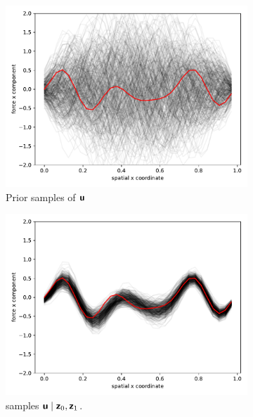 \documentclass{article}
\theoremstyle{plain}
\theoremstyle{definition}
\theoremstyle{remark}
\begin{document}
\begin{figure}[h!t]
    \begin{subfigure}{0.3\textwidth}
        \includegraphics[scale=0.35]{meth_ex_guess_0.pdf}
         \caption{Prior samples of \(\boldsymbol{\mathsf{u}}\)}
         \label{fig:meth_ex_0}
    \end{subfigure}
    \begin{subfigure}{0.3\textwidth}
        \includegraphics[scale=0.35]{meth_ex_guess_1.pdf}
         \caption{\meth{} samples \(\boldsymbol{\mathsf{u}}\mid \boldsymbol{\mathsf{z}}_0,\boldsymbol{\mathsf{z}}_1\).}
         \label{fig:meth_ex_1}
    \end{subfigure}
    \begin{subfigure}{0.3\textwidth}

\end{subfigure}
\end{figure}
\end{document}
